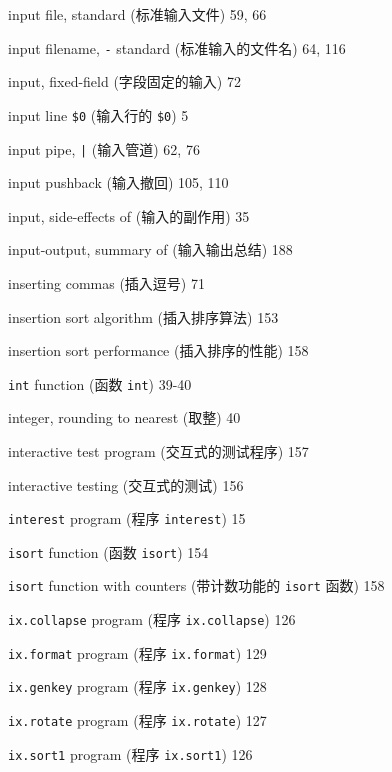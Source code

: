 \begin{multicols}{2}
\hangindent=2pc  input file, standard (标准输入文件) 59, 66

\hangindent=2pc  input filename, \verb'-' standard
(标准输入的文件名) 64, 116

\hangindent=2pc  input, fixed-field (字段固定的输入) 72

\hangindent=2pc  input line \verb'$0' (输入行的 \verb'$0') 5

\hangindent=2pc  input pipe, \verb'|' (输入管道) 62, 76

\hangindent=2pc  input pushback (输入撤回) 105, 110

\hangindent=2pc  input, side-effects of (输入的副作用) 35

\hangindent=2pc  input-output, summary of (输入输出总结) 188

\hangindent=2pc  inserting commas (插入逗号) 71

\hangindent=2pc  insertion sort algorithm (插入排序算法) 153

\hangindent=2pc  insertion sort performance (插入排序的性能) 158

\hangindent=2pc  \verb'int' function (函数 \verb'int') 39-40

\hangindent=2pc  integer, rounding to nearest (取整) 40

\hangindent=2pc  interactive test program (交互式的测试程序) 157

\hangindent=2pc  interactive testing (交互式的测试) 156

\hangindent=2pc  \verb'interest' program (程序 \verb'interest') 15 

\hangindent=2pc  \verb'isort' function (函数 \verb'isort') 154

\hangindent=2pc  \verb'isort' function with counters
(带计数功能的 \verb'isort' 函数) 158

\hangindent=2pc  \verb'ix.collapse' program (程序
\verb'ix.collapse') 126

\hangindent=2pc  \verb'ix.format' program (程序
\verb'ix.format') 129 

\hangindent=2pc  \verb'ix.genkey' program (程序
\verb'ix.genkey') 128 

\hangindent=2pc  \verb'ix.rotate' program (程序
\verb'ix.rotate') 127 

\hangindent=2pc  \verb'ix.sort1' program (程序 \verb'ix.sort1') 126


\end{multicols}
